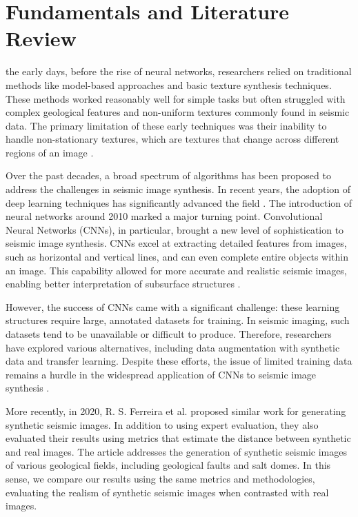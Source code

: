 \documentclass{ieeeaccess}
\begin{document}
\section{Fundamentals and Literature Review}

  the early days, before the rise of neural networks, researchers relied on traditional methods like model-based approaches and basic texture synthesis techniques. These methods worked reasonably well for simple tasks but often struggled with complex geological features and non-uniform textures commonly found in seismic data. The primary limitation of these early techniques was their inability to handle non-stationary textures, which are textures that change across different regions of an image \cite{ref16}.

 Over the past decades, a broad spectrum of algorithms has been proposed to address the challenges in seismic image synthesis. In recent years, the adoption of deep learning techniques has significantly advanced the field \cite{ref5}. The introduction of neural networks around 2010 marked a major turning point. Convolutional Neural Networks (CNNs), in particular, brought a new level of sophistication to seismic image synthesis. CNNs excel at extracting detailed features from images, such as horizontal and vertical lines, and can even complete entire objects within an image. This capability allowed for more accurate and realistic seismic images, enabling better interpretation of subsurface structures \cite{ref14}. 

However, the success of CNNs came with a significant challenge: these learning structures require large, annotated datasets for training. In seismic imaging, such datasets tend to be unavailable or difficult to produce. Therefore, researchers have explored various alternatives, including data augmentation with synthetic data and transfer learning. Despite these efforts, the issue of limited training data remains a hurdle in the widespread application of CNNs to seismic image synthesis \cite{ref15}.

More recently, in 2020, R. S. Ferreira et al. \cite{ref19} proposed similar work for generating synthetic seismic images. In addition to using expert evaluation, they also evaluated their results using metrics that estimate the distance between synthetic and real images. The article addresses the generation of synthetic seismic images of various geological fields, including geological faults and salt domes. In this sense, we compare our results using the same metrics and methodologies, evaluating the realism of synthetic seismic images when contrasted with real images.
\end{document}
